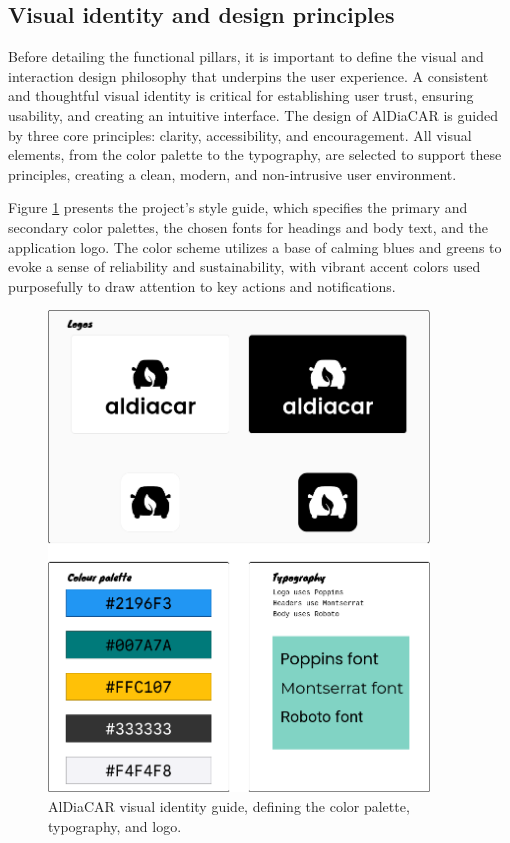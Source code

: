 \subsection{Visual identity and design principles}

Before detailing the functional pillars, it is important to define the visual and interaction design philosophy that underpins the user experience. A consistent and thoughtful visual identity is critical for establishing user trust, ensuring usability, and creating an intuitive interface. The design of AlDiaCAR is guided by three core principles: clarity, accessibility, and encouragement. All visual elements, from the color palette to the typography, are selected to support these principles, creating a clean, modern, and non-intrusive user environment.

\textgap

Figure \ref{fig:visual-identity} presents the project's style guide, which specifies the primary and secondary color palettes, the chosen fonts for headings and body text, and the application logo. The color scheme utilizes a base of calming blues and greens to evoke a sense of reliability and sustainability, with vibrant accent colors used purposefully to draw attention to key actions and notifications.

\begin{figure}[H]
\centering
\includegraphics[width=0.9\textwidth]{images/branding/moodboard.png}
\caption{AlDiaCAR visual identity guide, defining the color palette, typography, and logo.}
\label{fig:visual-identity}
\end{figure}

